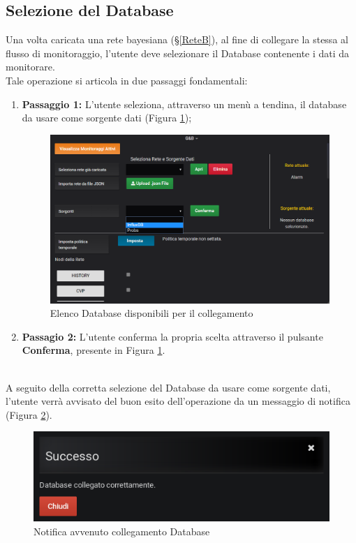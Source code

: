\subsection{Selezione del Database}\label{SelectDB}

Una volta caricata una rete bayesiana (§\ref{ReteB}), al fine di collegare la stessa al flusso di monitoraggio, l'utente deve selezionare il Database contenente i dati da monitorare.\\
Tale operazione si articola in due passaggi fondamentali:
\begin{enumerate}
	\item \textbf{Passaggio 1:} L'utente seleziona, attraverso un menù a tendina, il database da usare come sorgente dati (Figura \ref{Sorgenti});
	\begin{figure}[H]
	\begin{center}
		\includegraphics[scale=0.68]{./images/Sorgenti.png}
		 \caption{Elenco Database disponibili per il collegamento}	
		 \label{Sorgenti}
	\end{center}
	\end{figure}
	\item \textbf{Passagio 2:} L'utente conferma la propria scelta attraverso il pulsante \textbf{Conferma}, presente in Figura \ref{Sorgenti}.
\end{enumerate}
~\\
A seguito della corretta selezione del Database da usare come sorgente dati, l'utente verrà avvisato del buon esito dell'operazione da un messaggio di notifica (Figura \ref{NotificaSorgente}). 

\begin{figure}[H]
	\begin{center}
		\includegraphics[scale=0.6]{./images/NotificaSorgente.png}
		 \caption{Notifica avvenuto collegamento Database}	
		 \label{NotificaSorgente}
	\end{center}
\end{figure}